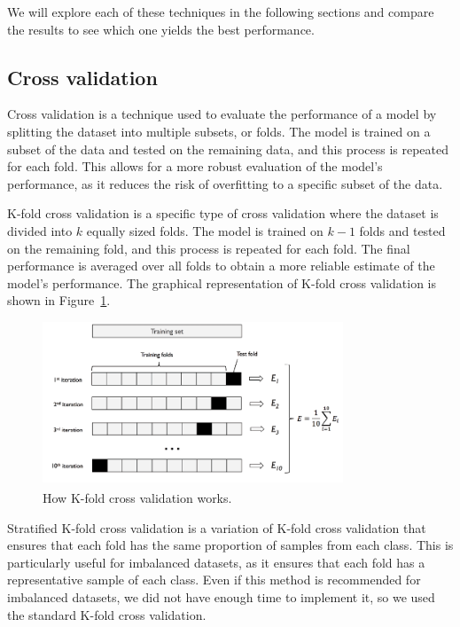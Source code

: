 We will explore each of these techniques in the following sections and compare the results to see which one yields the best performance.

\subsection{Cross validation}
\label{subsec:cross_validation}

Cross validation is a technique used to evaluate the performance of a model by splitting the dataset into multiple subsets, or folds.
The model is trained on a subset of the data and tested on the remaining data, and this process is repeated for each fold.
This allows for a more robust evaluation of the model's performance, as it reduces the risk of overfitting to a specific subset of the data.
\label{subsubsec:k_fold_cross_validation}

K-fold cross validation is a specific type of cross validation where the dataset is divided into $k$ equally sized folds. The model is trained
on $k-1$ folds and tested on the remaining fold, and this process is repeated for each fold. The final performance is averaged over all folds
to obtain a more reliable estimate of the model's performance. The graphical representation of K-fold cross validation is shown in Figure~\ref{fig:k_fold}.

\begin{figure}[htbp]
	\centering
	\includegraphics[width=0.8\textwidth]{../imgs/kfold.png}
	\caption{How K-fold cross validation works.\textsuperscript{\cite{Raschka-Mirjalili-2017}}}
	\label{fig:k_fold}
\end{figure}


\label{subsubsec:stratified_k_fold_cross_validation}

Stratified K-fold cross validation is a variation of K-fold cross validation that ensures that each fold has the same proportion of samples
from each class. This is particularly useful for imbalanced datasets, as it ensures that each fold has a representative sample of each class.
Even if this method is recommended for imbalanced datasets, we did not have enough time to implement it, so we used the standard K-fold cross
validation.

